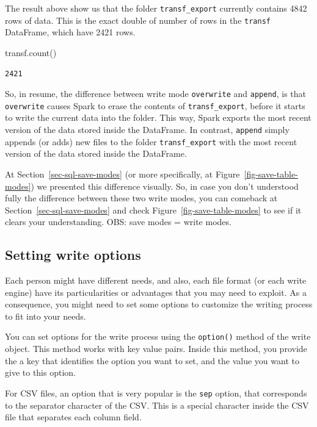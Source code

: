 \documentclass[
  11pt,
  letterpaper,
  DIV=11,
  numbers=noendperiod]{scrreprt}
\newenvironment{Shaded}{\begin{snugshade}}{\end{snugshade}}
\newcommand{\NormalTok}[1]{\textcolor[rgb]{0.00,0.23,0.31}{#1}}
\begin{document}
The result above show us that the folder \texttt{transf\_export}
currently contains 4842 rows of data. This is the exact double of number
of rows in the \texttt{transf} DataFrame, which have 2421 rows.

\begin{Shaded}
\begin{Highlighting}[]
\NormalTok{transf.count()}
\end{Highlighting}
\end{Shaded}

\begin{verbatim}
2421
\end{verbatim}

So, in resume, the difference between write mode \texttt{overwrite} and
\texttt{append}, is that \texttt{overwrite} causes Spark to erase the
contents of \texttt{transf\_export}, before it starts to write the
current data into the folder. This way, Spark exports the most recent
version of the data stored inside the DataFrame. In contrast,
\texttt{append} simply appends (or adds) new files to the folder
\texttt{transf\_export} with the most recent version of the data stored
inside the DataFrame.

At Section~\ref{sec-sql-save-modes} (or more specifically, at
Figure~\ref{fig-save-table-modes}) we presented this difference
visually. So, in case you don't understood fully the difference between
these two write modes, you can comeback at
Section~\ref{sec-sql-save-modes} and check
Figure~\ref{fig-save-table-modes} to see if it clears your
understanding. OBS: save modes = write modes.

\subsection{Setting write options}\label{setting-write-options}

Each person might have different needs, and also, each file format (or
each write engine) have its particularities or advantages that you may
need to exploit. As a consequence, you might need to set some options to
customize the writing process to fit into your needs.

You can set options for the write process using the \texttt{option()}
method of the write object. This method works with key value pairs.
Inside this method, you provide the a key that identifies the option you
want to set, and the value you want to give to this option.

For CSV files, an option that is very popular is the \texttt{sep}
option, that corresponds to the separator character of the CSV. This is
a special character inside the CSV file that separates each column
field.
\end{document}
